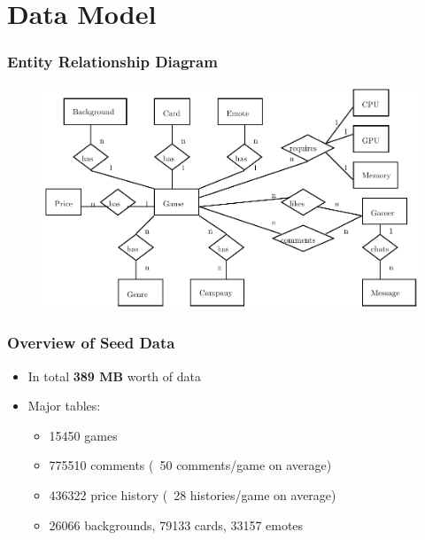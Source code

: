 \section{Data Model}
\begin{frame}
\frametitle{Entity Relationship Diagram}

\begin{figure}
	\includegraphics[scale=0.7]{erd.pdf}
\end{figure}

\end{frame}

\begin{frame}
\frametitle{Overview of Seed Data}
	\begin{itemize}[<+->]
		\setlength\itemsep{1em}
		\item In total \textbf{389 MB} worth of data
		\item Major tables:
			\begin{itemize}
				\setlength\itemsep{1em}
				\item 15450 games
				\item 775510 comments (~50 comments/game on average)
				\item 436322 price history (~28 histories/game on average)
				\item 26066 backgrounds, 79133 cards, 33157 emotes
			\end{itemize}
	\end{itemize}
\end{frame}
